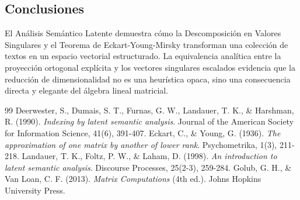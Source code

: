 \documentclass[11pt,a4paper]{article}
\begin{document}
\subsection{Conclusiones}
El Análisis Semántico Latente demuestra cómo la Descomposición en Valores Singulares y el Teorema de Eckart-Young-Mirsky transforman una colección de textos en un espacio vectorial estructurado. La equivalencia analítica entre la proyección ortogonal explícita y los vectores singulares escalados evidencia que la reducción de dimensionalidad no es una heurística opaca, sino una consecuencia directa y elegante del álgebra lineal matricial.

\begin{thebibliography}{99}
 Deerwester, S., Dumais, S. T., Furnas, G. W., Landauer, T. K., \& Harshman, R. (1990). \textit{Indexing by latent semantic analysis}. Journal of the American Society for Information Science, 41(6), 391-407.
 Eckart, C., \& Young, G. (1936). \textit{The approximation of one matrix by another of lower rank}. Psychometrika, 1(3), 211-218.
 Landauer, T. K., Foltz, P. W., \& Laham, D. (1998). \textit{An introduction to latent semantic analysis}. Discourse Processes, 25(2-3), 259-284.
 Golub, G. H., \& Van Loan, C. F. (2013). \textit{Matrix Computations} (4th ed.). Johns Hopkins University Press.
\end{thebibliography}
\end{document}
